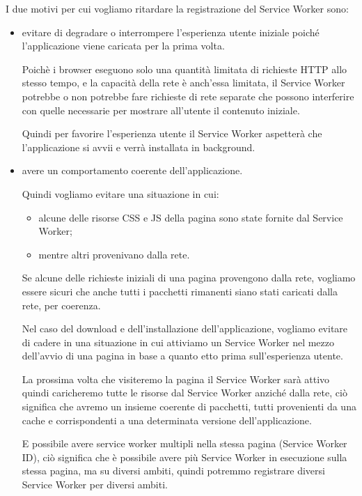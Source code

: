 \documentclass[italian]{article}
\begin{document}
I due motivi per cui vogliamo ritardare la registrazione del Service Worker sono:
\begin{itemize}
\item  evitare di degradare o interrompere l'esperienza utente iniziale poiché l'applicazione viene caricata per la prima volta.

Poichè i browser eseguono solo una quantità limitata di richieste HTTP allo stesso tempo, e la capacità della rete è anch'essa limitata, il Service Worker potrebbe o non potrebbe fare richieste di rete separate che possono interferire con quelle necessarie per mostrare all'utente il contenuto iniziale.

Quindi per favorire l'esperienza utente il Service Worker aspetterà che l'applicazione si avvii e verrà installata in background.

\item avere un comportamento coerente dell'applicazione. 

Quindi vogliamo evitare una situazione in cui:
\begin{itemize}
\item alcune delle risorse CSS e JS della pagina sono state fornite dal Service Worker;
\item mentre altri provenivano dalla rete.
\end{itemize}
Se alcune delle richieste iniziali di una pagina provengono dalla rete, vogliamo essere sicuri che anche tutti i pacchetti rimanenti siano stati caricati dalla rete, per coerenza.

Nel caso del download e dell'installazione dell'applicazione, vogliamo evitare di cadere in una situazione in cui attiviamo un Service Worker nel mezzo dell'avvio di una pagina in base a quanto etto prima sull'esperienza utente.

La prossima volta che visiteremo la pagina il Service Worker sarà attivo quindi caricheremo tutte le risorse dal Service Worker anziché dalla rete, ciò significa che avremo un insieme coerente di pacchetti, tutti provenienti da una cache e corrispondenti a una determinata versione dell'applicazione.

E possibile avere service worker multipli nella stessa pagina (Service Worker ID), ciò significa che è possibile avere più Service Worker in esecuzione sulla stessa pagina, ma su diversi ambiti, quindi potremmo registrare diversi Service Worker per diversi ambiti.

\end{itemize}
\end{document}
